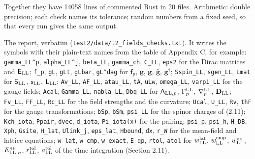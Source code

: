 \documentclass[
  10pt,
]{article}
\begin{document}
Together they have 14058 lines of commented Rust in 20 files.
Arithmetic: double precision; each check names its tolerance; random
numbers from a fixed seed, so that every run gives the same output.

The report, verbatim (\texttt{test2/data/t2\_fields\_checks.txt}). It
writes the symbols with their plain-text names from the table of
Appendix C, for example: \texttt{gamma\_LL\^{}p},
\texttt{alpha\_LL\^{}j}, \texttt{beta\_LL}, \texttt{gamma\_ch},
\texttt{C\_LL}, \texttt{eps2} for the Dirac matrices and
\(\mathsf E_{\rm LL}\); \texttt{f\_p}, \texttt{gL}, \texttt{gLt},
\texttt{gLbar}, \texttt{gL\^{}dag} for \(\mathbf f_p\), \(\mathbf g\),
\(\tilde{\mathbf g}\), \(\bar{\mathbf g}\), \(\mathbf g^\dagger\);
\texttt{Sspin\_LL}, \texttt{sgen\_LL}, \texttt{Lmat} for
\(\mathsf S_{\rm LL}\), \(\mathsf s_{\rm LL}\), \(\mathsf L_{\rm LL}\);
\texttt{Av\_LL}, \texttt{AF\_LL}, \texttt{atau\_LL}, \texttt{tA},
\texttt{uLw}, \texttt{omega\_LL}, \texttt{varpi\_LL} for the gauge
fields; \texttt{Acal}, \texttt{Gamma\_LL}, \texttt{nabla\_LL},
\texttt{Dbq\_LL} for \(\mathsf A_{{\rm LL},p}\), \(\Gamma^{\rm LL}_p\),
\(\nabla^{\rm LL}_p\), \(\mathbf D_{\rm LL}\); \texttt{Fv\_LL},
\texttt{FF\_LL}, \texttt{Rc\_LL} for the field strengths and the
curvature; \texttt{Ucal}, \texttt{U\_LL}, \texttt{Rv}, \texttt{thF} for
the gauge transformations; \texttt{bSp}, \texttt{bSm},
\texttt{psi\textquotesingle{}\_LL} for the spinor charges of (2.11);
\texttt{Kch\_iota}, \texttt{Ppair}, \texttt{dvec}, \texttt{d\_iota},
\texttt{Pi\_iota(x)} for the pairing; \texttt{psi\_p}, \texttt{psi\_h},
\texttt{H\_DB}, \texttt{Xph}, \texttt{Gsite}, \texttt{H\_lat},
\texttt{Ulink\_j}, \texttt{eps\_lat}, \texttt{Hbound}, \texttt{dx},
\texttt{r\_W} for the mean-field and lattice equations; \texttt{w\_lat},
\texttt{w\_cmp}, \texttt{w\_exact}, \texttt{E\_qp}, \texttt{rtol},
\texttt{atol} for \(w^{\rm lat}_{\rm LL}\), \(w^{\rm cmp}_{\rm LL}\),
\(w^{\rm ex}_{\rm LL}\), \(E^{\rm qp}_{{\rm LL},n}\),
\(r^{\rm tol}_{\rm LL}\), \(a^{\rm tol}_{\rm LL}\) of the time
integration (Section 2.11).
\end{document}
